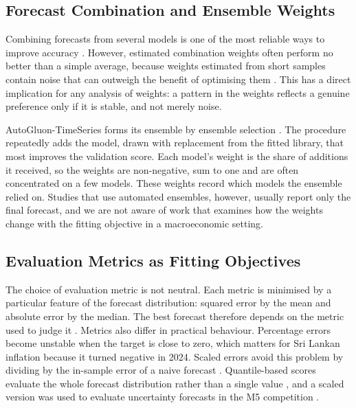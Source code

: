 \documentclass[12pt]{article}
\begin{document}
\subsection{Forecast Combination and Ensemble Weights}
\label{sec:lit-ensembles}

Combining forecasts from several models is one of the most reliable ways to
improve accuracy \citep{bates1969, timmermann2006, wang2023combination}.
However, estimated combination weights often perform no better than a simple
average, because weights estimated from short samples contain noise that can
outweigh the benefit of optimising them \citep{smith2009, claeskens2016}. This
has a direct implication for any analysis of weights: a pattern in the weights
reflects a genuine preference only if it is stable, and not merely noise.

AutoGluon-TimeSeries forms its ensemble by ensemble selection
\citep{caruana2004}. The procedure repeatedly adds the model, drawn with
replacement from the fitted library, that most improves the validation score.
Each model's weight is the share of additions it received, so the weights are
non-negative, sum to one and are often concentrated on a few models. These
weights record which models the ensemble relied on. Studies that use
automated ensembles, however, usually report only the final forecast, and we
are not aware of work that examines how the weights change with the fitting
objective in a macroeconomic setting.

\subsection{Evaluation Metrics as Fitting Objectives}
\label{sec:lit-evaluation}

The choice of evaluation metric is not neutral. Each metric is minimised by a
particular feature of the forecast distribution: squared error by the mean and
absolute error by the median. The best forecast therefore depends on the
metric used to judge it \citep{gneiting2011, kolassa2020}. Metrics also differ
in practical behaviour. Percentage errors become unstable when the target is
close to zero, which matters for Sri Lankan inflation because it turned
negative in 2024. Scaled errors avoid this problem by dividing by the
in-sample error of a naive forecast \citep{hyndman2006}. Quantile-based
scores evaluate the whole forecast distribution rather than a single value
\citep{gneiting2007}, and a scaled version was used to evaluate uncertainty
forecasts in the M5 competition \citep{makridakis2022m5unc}.
\end{document}
